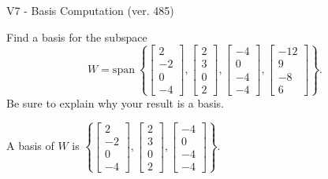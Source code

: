 \begin{exercise}
  \begin{exerciseTitle}V7 - Basis Computation (ver. 485)\end{exerciseTitle}
  \begin{exerciseStatement}
    Find a basis for the subspace 
\[W=\mathrm{span}\ \left\{\left[\begin{array}{r}
2 \\
-2 \\
0 \\
-4
\end{array}\right] , \left[\begin{array}{r}
2 \\
3 \\
0 \\
2
\end{array}\right] , \left[\begin{array}{r}
-4 \\
0 \\
-4 \\
-4
\end{array}\right] , \left[\begin{array}{r}
-12 \\
9 \\
-8 \\
6
\end{array}\right]\right\}.\]
 Be sure to explain why your result is a basis.


  \end{exerciseStatement}
  \begin{exerciseAnswer}
   A basis of \(W\) is  \(\left\{\left[\begin{array}{r}
2 \\
-2 \\
0 \\
-4
\end{array}\right] , \left[\begin{array}{r}
2 \\
3 \\
0 \\
2
\end{array}\right] , \left[\begin{array}{r}
-4 \\
0 \\
-4 \\
-4
\end{array}\right]\right\}\).
  


  \end{exerciseAnswer}
\end{exercise}
